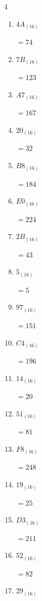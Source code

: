 \begin{multicols}{4}
\begin{enumerate}
  \item $4A_{(16)}$

        $=74$

  \item $7B_{(16)}$

        $=123$

  \item $A7_{(16)}$

        $=167$

  \item $20_{(16)}$

        $=32$

  \item $B8_{(16)}$

        $=184$

  \item $E0_{(16)}$

        $=224$

  \item $2B_{(16)}$

        $=43$

  \item $5_{(16)}$

        $=5$

  \item $97_{(16)}$

        $=151$

  \item $C4_{(16)}$

        $=196$

  \item $14_{(16)}$

        $=20$

  \item $51_{(16)}$

        $=81$

\columnbreak %

  \item $F8_{(16)}$

        $=248$

  \item $19_{(16)}$

        $=25$

  \item $D3_{(16)}$

        $=211$

  \item $52_{(16)}$

        $=82$

  \item $29_{(16)}$


\end{enumerate}
\end{multicols}
